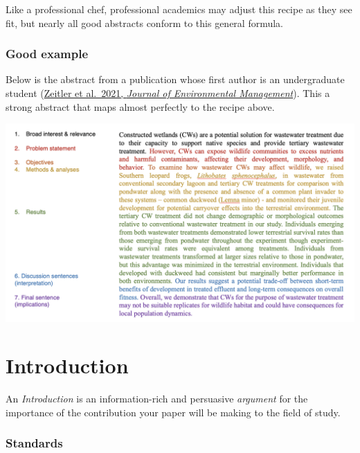\documentclass[
]{book}
\begin{document}
Like a professional chef, professional academics may adjust this recipe as they see fit, but nearly all good abstracts conform to this general formula.

\hypertarget{good-example}{%
\subsubsection*{Good example}\label{good-example}}

Below is the abstract from a publication whose first author is an undergraduate student (\href{https://www.sciencedirect.com/science/article/pii/S0301479721006332?casa_token=BhsD4GiVQhIAAAAA:78wrLH-vN5gUPvNdX16fyaoHJq8QVQpQ-mqVA6UqxpxLMOFKweuX0YwJtBMLMnmVnfU4e1k}{Zeitler et al.~2021, \emph{Journal of Environmental Management}}). This a strong abstract that maps almost perfectly to the recipe above.

\includegraphics{img/abstracts-map.png}

\hypertarget{introduction-2}{%
\section*{Introduction}\label{introduction-2}}

An \emph{Introduction} is an information-rich and persuasive \emph{argument} for the importance of the contribution your paper will be making to the field of study.

\hypertarget{standards-1}{%
\subsubsection*{Standards}\label{standards-1}}
\end{document}
